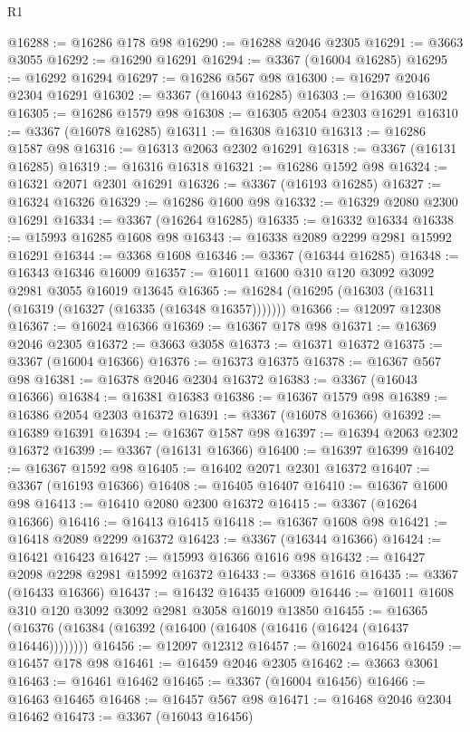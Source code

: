 \begin{lexlean}{R1}
\begin{coremodule}
@16288 := @16286 @178 @98
@16290 := @16288 @2046 @2305
@16291 := @3663 @3055
@16292 := @16290 @16291
@16294 := @3367 (@16004 @16285)
@16295 := @16292 @16294
@16297 := @16286 @567 @98
@16300 := @16297 @2046 @2304 @16291
@16302 := @3367 (@16043 @16285)
@16303 := @16300 @16302
@16305 := @16286 @1579 @98
@16308 := @16305 @2054 @2303 @16291
@16310 := @3367 (@16078 @16285)
@16311 := @16308 @16310
@16313 := @16286 @1587 @98
@16316 := @16313 @2063 @2302 @16291
@16318 := @3367 (@16131 @16285)
@16319 := @16316 @16318
@16321 := @16286 @1592 @98
@16324 := @16321 @2071 @2301 @16291
@16326 := @3367 (@16193 @16285)
@16327 := @16324 @16326
@16329 := @16286 @1600 @98
@16332 := @16329 @2080 @2300 @16291
@16334 := @3367 (@16264 @16285)
@16335 := @16332 @16334
@16338 := @15993 @16285 @1608 @98
@16343 := @16338 @2089 @2299 @2981 @15992 @16291
@16344 := @3368 @1608
@16346 := @3367 (@16344 @16285)
@16348 := @16343 @16346 @16009
@16357 := @16011 @1600 @310 @120 @3092 @3092 @2981 @3055 @16019 @13645
@16365 := @16284 (@16295 (@16303 (@16311 (@16319 (@16327 (@16335 (@16348 @16357)))))))
@16366 := @12097 @12308
@16367 := @16024 @16366
@16369 := @16367 @178 @98
@16371 := @16369 @2046 @2305
@16372 := @3663 @3058
@16373 := @16371 @16372
@16375 := @3367 (@16004 @16366)
@16376 := @16373 @16375
@16378 := @16367 @567 @98
@16381 := @16378 @2046 @2304 @16372
@16383 := @3367 (@16043 @16366)
@16384 := @16381 @16383
@16386 := @16367 @1579 @98
@16389 := @16386 @2054 @2303 @16372
@16391 := @3367 (@16078 @16366)
@16392 := @16389 @16391
@16394 := @16367 @1587 @98
@16397 := @16394 @2063 @2302 @16372
@16399 := @3367 (@16131 @16366)
@16400 := @16397 @16399
@16402 := @16367 @1592 @98
@16405 := @16402 @2071 @2301 @16372
@16407 := @3367 (@16193 @16366)
@16408 := @16405 @16407
@16410 := @16367 @1600 @98
@16413 := @16410 @2080 @2300 @16372
@16415 := @3367 (@16264 @16366)
@16416 := @16413 @16415
@16418 := @16367 @1608 @98
@16421 := @16418 @2089 @2299 @16372
@16423 := @3367 (@16344 @16366)
@16424 := @16421 @16423
@16427 := @15993 @16366 @1616 @98
@16432 := @16427 @2098 @2298 @2981 @15992 @16372
@16433 := @3368 @1616
@16435 := @3367 (@16433 @16366)
@16437 := @16432 @16435 @16009
@16446 := @16011 @1608 @310 @120 @3092 @3092 @2981 @3058 @16019 @13850
@16455 := @16365 (@16376 (@16384 (@16392 (@16400 (@16408 (@16416 (@16424 (@16437 @16446))))))))
@16456 := @12097 @12312
@16457 := @16024 @16456
@16459 := @16457 @178 @98
@16461 := @16459 @2046 @2305
@16462 := @3663 @3061
@16463 := @16461 @16462
@16465 := @3367 (@16004 @16456)
@16466 := @16463 @16465
@16468 := @16457 @567 @98
@16471 := @16468 @2046 @2304 @16462
@16473 := @3367 (@16043 @16456)

\end{coremodule}
\end{lexlean}
